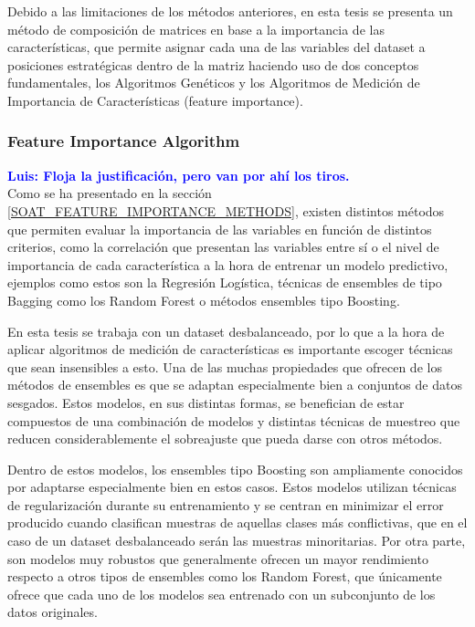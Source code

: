\documentclass{uathesis-es}
\begin{document}
{	Debido a las limitaciones de los métodos anteriores, en esta tesis se presenta un método de composición de matrices en base a la importancia de las características, que permite asignar cada una de las variables del dataset a posiciones estratégicas dentro de la matriz haciendo uso de dos conceptos fundamentales, los Algoritmos Genéticos y los Algoritmos de Medición de Importancia de Características (feature importance).
	
	\subsubsection{Feature Importance Algorithm}
	\label{FEATURE_IMPORTANCE:ALGORITM_JUSTIFICATION}
	\textcolor{blue}{\textbf{Luis: Floja la justificación, pero van por ahí los tiros.}}\\
	
	Como se ha presentado en la sección \ref{SOAT_FEATURE_IMPORTANCE_METHODS}, existen distintos métodos que permiten evaluar la importancia de las variables en función de distintos criterios, como la correlación que presentan las variables entre sí o el nivel de importancia de cada característica a la hora de entrenar un modelo predictivo, ejemplos como estos son la Regresión Logística, técnicas de ensembles de tipo Bagging como los Random Forest o métodos ensembles tipo Boosting.
	
	
	En esta tesis se trabaja con un dataset desbalanceado, por lo que a la hora de aplicar algoritmos de medición de características es importante escoger técnicas que sean insensibles a esto. Una de las muchas propiedades que ofrecen de los métodos de ensembles es que se adaptan especialmente bien a conjuntos de datos sesgados. Estos modelos, en sus distintas formas, se benefician de estar compuestos de una combinación de modelos y distintas técnicas de muestreo que reducen considerablemente el sobreajuste que pueda darse con otros métodos.
	
	Dentro de estos modelos, los ensembles tipo Boosting son ampliamente conocidos por adaptarse especialmente bien en estos casos. Estos modelos utilizan técnicas de regularización durante su entrenamiento y se centran en minimizar el error producido cuando clasifican muestras de aquellas clases más conflictivas, que en el caso de un dataset desbalanceado serán las muestras minoritarias. Por otra parte, son modelos muy robustos que generalmente ofrecen un mayor rendimiento respecto a otros tipos de ensembles como los Random Forest, que únicamente ofrece que cada uno de los modelos sea entrenado con un subconjunto de los datos originales.
	
}
\end{document}
